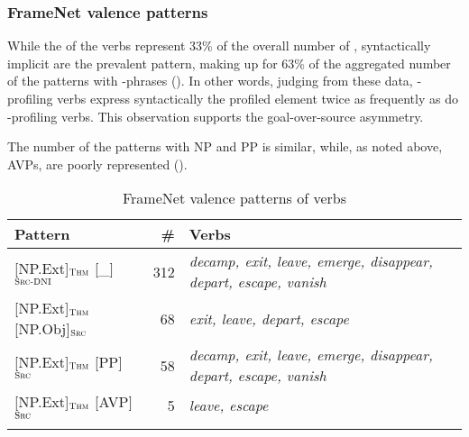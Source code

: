 \documentclass[output=paper,colorlinks,citecolor=brown]{langscibook}
\begin{document}
\subsubsection{FrameNet valence patterns}

While the  of the  verbs represent 33\% of the overall number of , syntactically implicit  are the prevalent pattern, making up for 63\% of the aggregated number of the patterns with -phrases (). In other words, judging from these data, -profiling verbs express syntactically the profiled element twice as frequently as do -profiling verbs. This observation supports the goal-over-source asymmetry.

The number of the patterns with NP and PP  is similar, while, as noted above, AVPs, are poorly represented ().


\begin{table}
   \begin{tabularx}{\textwidth}{ lrQ } 
   \lsptoprule
   Pattern & \# & Verbs \\ \midrule
   {[NP.Ext]}$_{\text{\textsc{Thm}}}$ {[\_]}$_{\text{\textsc{Src-DNI}}}$  & 312 & \textit{decamp, exit, leave, emerge, disappear, depart, escape, vanish}\\ 
{[NP.Ext]}$_{\text{\textsc{Thm}}}$ {[NP.Obj]}$_{\text{\textsc{Src}}}$  & 68 & \textit{exit, leave, depart, escape}\\ 
{[NP.Ext]}$_{\text{\textsc{Thm}}}$ {[PP]}$_{\text{\textsc{Src}}}$  & 58 & \textit{decamp, exit, leave, emerge, disappear, depart, escape, vanish}\\ 
{[NP.Ext]}$_{\text{\textsc{Thm}}}$ {[AVP]}$_{\text{\textsc{Src}}}$  & 5 & \textit{leave, escape}\\ 
\lspbottomrule
\end{tabularx}
    \caption{FrameNet valence patterns of  verbs}
    \label{tab:4:departing-valence-framenet}
\end{table}
\end{document}
